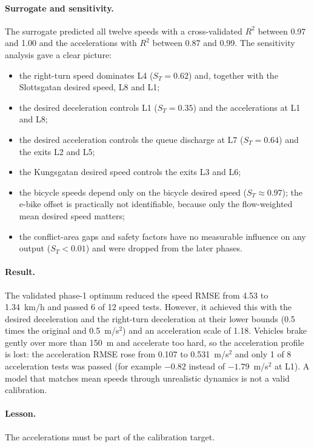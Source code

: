 \documentclass[11pt,a4paper]{article}
\newcommand{\kmh}{~km/h}
\newcommand{\mss}{~m/s$^2$}
\begin{document}
\paragraph{Surrogate and sensitivity.} The surrogate predicted all twelve speeds with a
cross-validated $R^2$ between 0.97 and 1.00 and the accelerations with $R^2$ between 0.87 and 0.99.
The sensitivity analysis gave a clear picture:
\begin{itemize}
  \item the right-turn speed dominates L4 ($S_T = 0.62$) and, together with the Slottsgatan desired
        speed, L8 and L1;
  \item the desired deceleration controls L1 ($S_T = 0.35$) and the accelerations at L1 and L8;
  \item the desired acceleration controls the queue discharge at L7 ($S_T = 0.64$) and the exits
        L2 and L5;
  \item the Kungsgatan desired speed controls the exits L3 and L6;
  \item the bicycle speeds depend only on the bicycle desired speed ($S_T \approx 0.97$); the
        e-bike offset is practically not identifiable, because only the flow-weighted mean desired
        speed matters;
  \item the conflict-area gaps and safety factors have no measurable influence on any output
        ($S_T < 0.01$) and were dropped from the later phases.
\end{itemize}

\paragraph{Result.} The validated phase-1 optimum reduced the speed RMSE from 4.53 to 1.34\kmh{}
and passed 6 of 12 speed tests. However, it achieved this with the desired deceleration and the
right-turn deceleration at their lower bounds (0.5 times the original and 0.5\mss) and an
acceleration scale of 1.18. Vehicles brake gently over more than 150~m and accelerate too hard, so
the acceleration profile is lost: the acceleration RMSE rose from 0.107 to 0.531\mss{} and only 1
of 8 acceleration tests was passed (for example $-0.82$ instead of $-1.79$\mss{} at L1). A model
that matches mean speeds through unrealistic dynamics is not a valid calibration.

\paragraph{Lesson.} The accelerations must be part of the calibration target.
\end{document}
